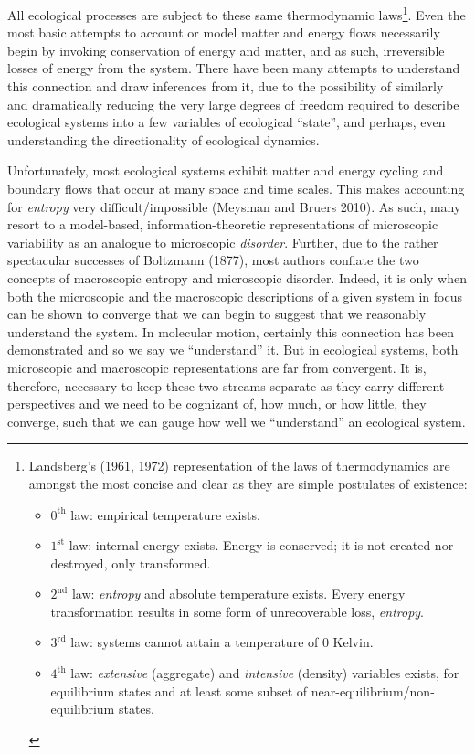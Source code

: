 \documentclass[11pt,letterpaper,]{paper}
\providecommand{\tightlist}{%
  \setlength{\itemsep}{0pt}\setlength{\parskip}{0pt}}
\begin{document}
All ecological processes are subject to these same thermodynamic
laws\footnote{Landsberg's (1961, 1972) representation of the laws of
  thermodynamics are amongst the most concise and clear as they are
  simple postulates of existence:

  \begin{itemize}
  \tightlist
  \item
    \(0^\text{th}\) law: empirical temperature exists.
  \item
    \(1^\text{st}\) law: internal energy exists. Energy is conserved; it
    is not created nor destroyed, only transformed.
  \item
    \(2^\text{nd}\) law: \emph{entropy} and absolute temperature exists.
    Every energy transformation results in some form of unrecoverable
    loss, \emph{entropy}.
  \item
    \(3^\text{rd}\) law: systems cannot attain a temperature of 0
    Kelvin.
  \item
    \(4^\text{th}\) law: \emph{extensive} (aggregate) and
    \emph{intensive} (density) variables exists, for equilibrium states
    and at least some subset of near-equilibrium/non-equilibrium states.
  \end{itemize}}. Even the most basic attempts to account or model
matter and energy flows necessarily begin by invoking conservation of
energy and matter, and as such, irreversible losses of energy from the
system. There have been many attempts to understand this connection and
draw inferences from it, due to the possibility of similarly and
dramatically reducing the very large degrees of freedom required to
describe ecological systems into a few variables of ecological
``state'', and perhaps, even understanding the directionality of
ecological dynamics.

Unfortunately, most ecological systems exhibit matter and energy cycling
and boundary flows that occur at many space and time scales. This makes
accounting for \emph{entropy} very difficult/impossible (Meysman and
Bruers 2010). As such, many resort to a model-based,
information-theoretic representations of microscopic variability as an
analogue to microscopic \emph{disorder}. Further, due to the rather
spectacular successes of Boltzmann (1877), most authors conflate the two
concepts of macroscopic entropy and microscopic disorder. Indeed, it is
only when both the microscopic and the macroscopic descriptions of a
given system in focus can be shown to converge that we can begin to
suggest that we reasonably understand the system. In molecular motion,
certainly this connection has been demonstrated and so we say we
``understand'' it. But in ecological systems, both microscopic and
macroscopic representations are far from convergent. It is, therefore,
necessary to keep these two streams separate as they carry different
perspectives and we need to be cognizant of, how much, or how little,
they converge, such that we can gauge how well we ``understand'' an
ecological system.
\end{document}
